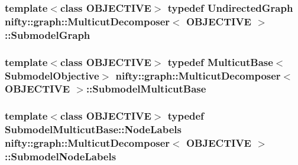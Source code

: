 \subsubsection[{Submodel\+Graph}]{\setlength{\rightskip}{0pt plus 5cm}template$<$class O\+B\+J\+E\+C\+T\+I\+V\+E$>$ typedef {\bf Undirected\+Graph} {\bf nifty\+::graph\+::\+Multicut\+Decomposer}$<$ O\+B\+J\+E\+C\+T\+I\+V\+E $>$\+::{\bf Submodel\+Graph}}\label{classnifty_1_1graph_1_1MulticutDecomposer_a8b90ad3406b214b8033428adba308579}
\hypertarget{classnifty_1_1graph_1_1MulticutDecomposer_a14dc9a97af7d8873557f7251e8c7eac1}{}
\subsubsection[{Submodel\+Multicut\+Base}]{\setlength{\rightskip}{0pt plus 5cm}template$<$class O\+B\+J\+E\+C\+T\+I\+V\+E$>$ typedef {\bf Multicut\+Base}$<${\bf Submodel\+Objective}$>$ {\bf nifty\+::graph\+::\+Multicut\+Decomposer}$<$ O\+B\+J\+E\+C\+T\+I\+V\+E $>$\+::{\bf Submodel\+Multicut\+Base}}\label{classnifty_1_1graph_1_1MulticutDecomposer_a14dc9a97af7d8873557f7251e8c7eac1}
\hypertarget{classnifty_1_1graph_1_1MulticutDecomposer_a7c58e88129178d3cd98f511d1b44fdd5}{}
\subsubsection[{Submodel\+Node\+Labels}]{\setlength{\rightskip}{0pt plus 5cm}template$<$class O\+B\+J\+E\+C\+T\+I\+V\+E$>$ typedef {\bf Submodel\+Multicut\+Base\+::\+Node\+Labels} {\bf nifty\+::graph\+::\+Multicut\+Decomposer}$<$ O\+B\+J\+E\+C\+T\+I\+V\+E $>$\+::{\bf Submodel\+Node\+Labels}}\label{classnifty_1_1graph_1_1MulticutDecomposer_a7c58e88129178d3cd98f511d1b44fdd5}
\hypertarget{classnifty_1_1graph_1_1MulticutDecomposer_a068c81973a716a49a5c38e7655e47542}{}
